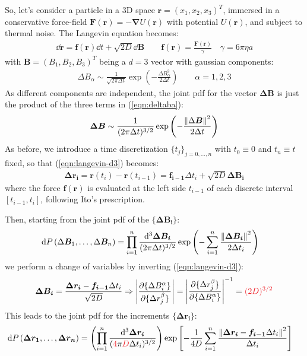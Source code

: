 \documentclass[../template.tex]{subfiles}
\begin{document}
So, let's consider a particle in a 3D space $\bm{r} = (x_1, x_2, x_3)^T$, immersed in a conservative force-field $\bm{F}(\bm{r}) = -\bm{\nabla} U(\bm{r})$ with potential $U(\bm{r})$, and subject to thermal noise. The Langevin equation becomes:
\begin{align}\label{eqn:langevin-d3}
    \dd{\bm{r}} = \bm{f}(\bm{r})  \dd{t} + \sqrt{2D} \dd{\bm{B}} \qquad \bm{f}(\bm{r}) = \frac{\bm{F}(\bm{r})}{\gamma} \quad \gamma= 6 \pi \eta a   
\end{align}     
with $\bm{B}= (B_1, B_2 , B_3 )^T$ being a $d=3$ vector with gaussian components:
\begin{align}
    \Delta B_\alpha \sim \frac{1}{\sqrt{2 \pi \Delta t} } \exp\left(-\frac{\Delta B^2_\alpha}{2 \Delta t} \right) \qquad \alpha =1,2,3
    \label{eqn:deltaba}
\end{align}
As different components are independent, the joint pdf for the vector $\bm{\Delta B}$ is just the product of the three terms in (\ref{eqn:deltaba}):
\begin{align*}
    \bm{\Delta B} \sim \frac{1}{(2 \pi \Delta t)^{3/2}} \exp\left(-\frac{\norm{\Delta \bm{B}}^2}{2 \Delta t} \right) 
\end{align*}  
As before, we introduce a time discretization $\{t_j\}_{j=0,\dots,n}$ with $t_0 \equiv 0$ and $t_n \equiv t$ fixed, so that (\ref{eqn:langevin-d3}) becomes:
\begin{align*}
    \bm{\Delta r_i} = \bm{r} (t_i) - \bm{r}(t_{i-1}) = \bm{f_{i-1}} \Delta t_i + \sqrt{2D} \bm{\Delta B_i} 
\end{align*}
where the force $\bm{f}(\bm{r})$ is evaluated at the left side $t_{i-1}$ of each discrete interval $[t_{i-1}, t_i]$, following Ito's prescription.

Then, starting from the joint pdf of the $\{\bm{\Delta B_i}\}$:
\begin{align*}
    \dd{P}(\Delta \bm{B}_1, \dots, \Delta \bm{B}_n) &= \prod_{i=1}^n \frac{\dd[3]{\bm{\Delta B_i}}}{(2 \pi \Delta t)^{3/2}} \exp\left(-\sum_{i=1}^n \frac{\norm{\bm{ \Delta B_i}}^2}{2 \Delta t_i} \right)
\end{align*}
we perform a change of variables by inverting (\ref{eqn:langevin-d3}):
\begin{align*}
    \bm{\Delta B_i} = \frac{\bm{\Delta r_i} - \bm{f_{i-1}} \Delta t_i}{\sqrt{2 D}} \Rightarrow \left|\pdv{\{{\Delta B_i^\alpha}\}}{\{\Delta r_j^\beta\}}  \right| = \left|\pdv{\{\Delta r_j^\beta\}}{\{{\Delta B_i^\alpha}\}} \right|^{-1} = \textcolor{Red}{(2D)^{3/2}}
\end{align*}
This leads to the joint pdf for the increments $\{\bm{\Delta r_i}\}$:
\begin{align}
    \dd{P}(\bm{\Delta r_1}, \dots, \bm{\Delta r_n}) &= \left(\prod_{i=1}^n \frac{\dd[3]{\bm{ \Delta r_i}}}{(\textcolor{Red}{4} \pi \textcolor{Red}{D} \Delta t_i)^{3/2}}\right) \exp\left[-\frac{1}{4D} \sum_{i=1}^n \frac{\norm{\bm{ \Delta r_i} - \bm{f_{i-1}} \Delta t_i}^2}{\Delta t_i}  \right] 
    \label{eqn:dP3}
\end{align}
\end{document}
